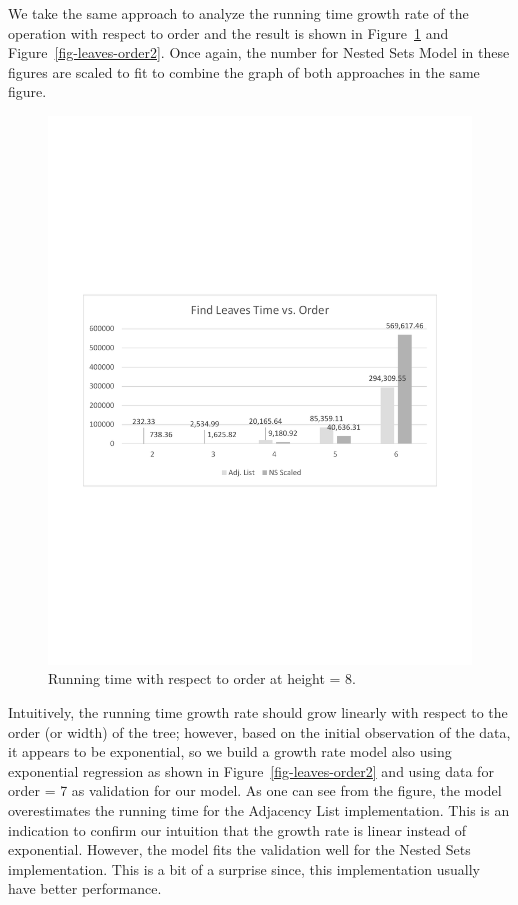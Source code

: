 We take the same approach to analyze the running time growth rate of the operation with respect to order and the result is shown in Figure~\ref{fig-leaves-order1} and Figure~\ref{fig-leaves-order2}. Once again, the number for Nested Sets Model in these figures are scaled to fit to combine the graph of both approaches in the same figure.

\begin{figure}[!h]
\begin{center}
\includegraphics[width=6in]{images/eval/leaves/order/col.pdf}
\caption{Running time with respect to order at height = 8.\label{fig-leaves-order1}}
\end{center}
\end{figure}

Intuitively, the running time growth rate should grow linearly with respect to the order (or width) of the tree; however, based on the initial observation of the data, it appears to be exponential, so we build a growth rate model also using exponential regression as shown in Figure~\ref{fig-leaves-order2} and using data for order = 7 as validation for our model. As one can see from the figure, the model overestimates the running time for the Adjacency List implementation. This is an indication to confirm our intuition that the growth rate is linear instead of exponential. However, the model fits the validation well for the Nested Sets implementation. This is a bit of a surprise since, this implementation usually have better performance.

